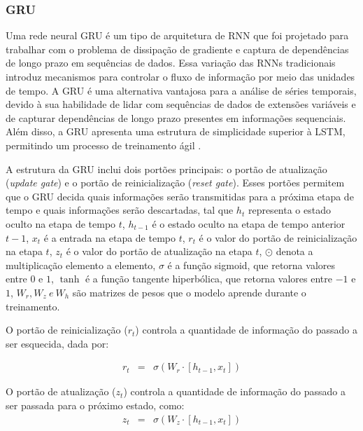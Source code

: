  \subsubsection{GRU}
 
Uma rede neural GRU é um tipo de arquitetura de RNN que foi projetado para trabalhar com o problema de dissipação de gradiente e captura de dependências de longo prazo em sequências de dados. Essa variação das RNNs tradicionais introduz mecanismos para controlar o fluxo de informação por meio das unidades de tempo.
A GRU é uma alternativa vantajosa para a análise de séries temporais, devido à sua habilidade de lidar com sequências de dados de extensões variáveis e de capturar dependências de longo prazo presentes em informações sequenciais. Além disso, a GRU apresenta uma estrutura de simplicidade superior à LSTM, permitindo um processo de treinamento ágil  \cite{mastersthesis53fd58a7}.
 
A estrutura da GRU inclui dois portões principais: o portão de atualização (\textit{update gate}) e o portão de reinicialização (\textit{reset gate}). Esses portões permitem que o GRU decida quais informações serão transmitidas para a próxima etapa de tempo e quais informações serão descartadas, tal que 
$ h_t $ representa o estado oculto na etapa de tempo $ t $, $ h_{t-1} $ é o estado oculto na etapa de tempo anterior $ t-1 $, $ x_t $ é a entrada na etapa de tempo $ t $, $ r_t $ é o valor do portão de reinicialização na etapa $ t $, $ z_t $ é o valor do portão de atualização na etapa $ t $, $ \odot $ denota a multiplicação elemento a elemento, $ \sigma $ é a função sigmoid, que retorna valores entre $0$ e $1$, $ \tanh $ é a função tangente hiperbólica, que retorna valores entre $-1$ e $1$, $ W_r, W_z\ e\ W_h $ são matrizes de pesos que o modelo aprende durante o treinamento.
 
O portão de reinicialização ($r_t$) controla a quantidade de informação do passado a ser esquecida, dada por:
 	
 	\begin{eqnarray}
 		r_t &=& \sigma(W_r \cdot [h_{t-1}, x_t])\label{eq:gru}
 	\end{eqnarray} 
 	
O portão de atualização ($z_t$) controla a quantidade de informação do passado a ser passada para o próximo estado, como:
 	\begin{eqnarray}
 		z_t &=& \sigma(W_z \cdot [h_{t-1}, x_t])\label{eq:gru1}
 	\end{eqnarray}
 

